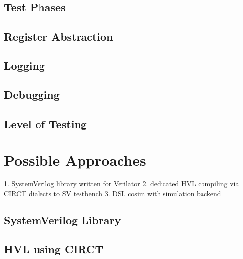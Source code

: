 \documentclass[12pt]{report}
\begin{document}
\subsection{Test Phases} %

\subsection{Register Abstraction} %

\subsection{Logging} %

\subsection{Debugging} %

\subsection{Level of Testing} %

\section{Possible Approaches} %

1. SystemVerilog library written for Verilator
2. dedicated HVL compiling via CIRCT dialects to SV testbench
3. DSL cosim with simulation backend

\subsection{SystemVerilog Library} %

\subsection{HVL using CIRCT} %
\end{document}

